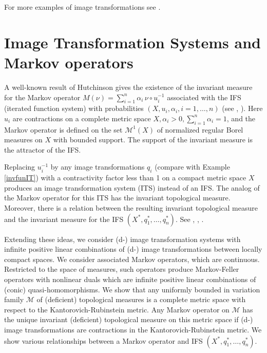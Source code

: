 \documentclass[sn-mathphys-num]{sn-jnl}%
\theoremstyle{thmstyleone}%
\theoremstyle{definition}
\begin{document}
\noindent
For more examples of image transformations see \cite[Sect. 3]{Butler:QLM}.
 
\section{Image Transformation Systems and Markov operators} \label{SectMarkov}

A well-known result of Hutchinson gives the existence of the invariant measure for the Markov  operator  
$M(\nu) = \sum_{i=1}^n \alpha_i \, \nu \circ u_i^{-1}$ associated with the IFS (iterated function system) with probabilities $(X, u_i, \alpha_i, i=1, \ldots, n)$
(see   \cite{Hutchinson}, \cite[Ch. IX]{Barnsley}).
Here $u_i$ are contractions on a complete metric space $X,   \alpha_i > 0,  \sum_{i=1}^n \alpha_i = 1$, and the Markov operator is defined on the set 
 $\mathscr{M}^1(X)$ of normalized regular Borel measures on $X$ with bounded support.
The support of the invariant measure is the attractor of the IFS.   

Replacing $u_i^{-1}$ by any image transformations $q_i$ (compare with Example \ref{invfunIT}) 
with a contractivity factor less than 1 on a compact metric space $X$ produces 
an image transformation system (ITS) instead of an IFS. 
The analog of  the Markov operator for this ITS  has the invariant topological measure.  
Moreover, there is a relation between the resulting invariant topological measure and the invariant measure for the IFS  $(X^*, q_1^*, \ldots, q_n^*)$.
See \cite[Pr. 5.2]{Aarnes:ITfirst}, \cite[Pr. 5.8]{Pedersen}, \cite[Pr. 36]{AarnesJohansenRustad}.  

Extending these ideas, we consider (d-) image transformation systems with infinite positive linear combinations of (d-) image transformations 
between locally compact spaces.  We consider associated Markov operators, which are continuous. 
Restricted to the space of measures, such operators produce
Markov-Feller operators with nonlinear duals which are infinite  positive linear combinations of (conic) quasi-homomorphisms.
We show that any uniformly bounded in variation family $\mathcal{M}$ of (deficient) topological measures is a complete metric space with respect to the 
Kantorovich-Rubinstein metric. Any Markov operator on  $\mathcal{M}$ has the unique invariant (deficient) topological measure on this metric space   
if (d-) image transformations are contractions in the Kantorovich-Rubinstein metric.
We show various relationships between a Markov operator and IFS  $(X^*, q_1^*, \ldots, q_n^*)$.   
\end{document}

